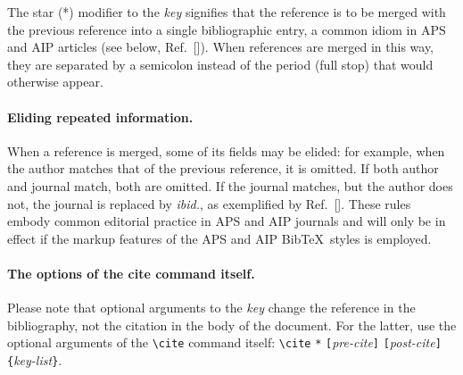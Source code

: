 \documentclass[%
 preprint, linenumbers,
 amsmath,amssymb,
 aps, physrev,
]{revtex4-2}
\begin{document}
The star (*) modifier to the \emph{key} signifies that the reference is to be 
merged with the previous reference into a single bibliographic entry, 
a common idiom in APS and AIP articles (see below, Ref.~[]). 
When references are merged in this way, they are separated by a semicolon instead of 
the period (full stop) that would otherwise appear.

\paragraph{Eliding repeated information.}
When a reference is merged, some of its fields may be elided: for example, 
when the author matches that of the previous reference, it is omitted. 
If both author and journal match, both are omitted.
If the journal matches, but the author does not, the journal is replaced by \emph{ibid.},
as exemplified by Ref.~[]. 
These rules embody common editorial practice in APS and AIP journals and will only
be in effect if the markup features of the APS and AIP Bib\TeX\ styles is employed.

\paragraph{The options of the cite command itself.}
Please note that optional arguments to the \emph{key} change the reference in the bibliography, 
not the citation in the body of the document. 
For the latter, use the optional arguments of the \verb+\cite+ command itself:
\verb+\cite+ \texttt{*}\allowbreak
\texttt{[}\emph{pre-cite}\texttt{]}\allowbreak
\texttt{[}\emph{post-cite}\texttt{]}\allowbreak
\verb+{+\emph{key-list}\verb+}+.
\end{document}
